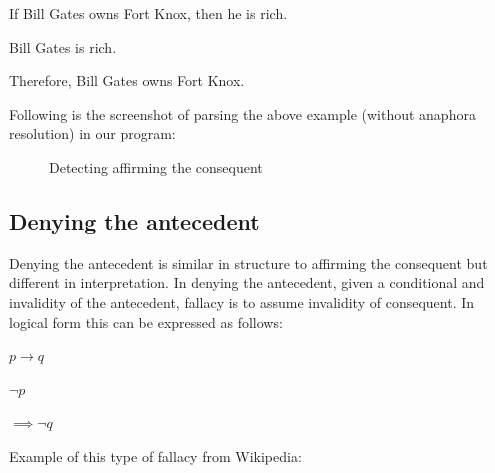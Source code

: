 \documentclass[14pt, english]{article}
\begin{document}
\begin{center}
If Bill Gates owns Fort Knox, then he is rich.
\par\end{center}

\begin{center}
Bill Gates is rich.
\par\end{center}

\begin{center}
Therefore, Bill Gates owns Fort Knox.
\par\end{center}

Following is the screenshot of parsing the above example (without anaphora
resolution) in our program:

\begin{figure}[htp]
 \caption{Detecting affirming the consequent} \end{figure}


\subsection{Denying the antecedent}

Denying the antecedent is similar in structure to affirming the consequent
but different in interpretation. In denying the antecedent, given a
conditional and invalidity of the antecedent, fallacy is to assume
invalidity of consequent. In logical form this can be expressed as
follows:

\begin{center}
$p\to q$
\par\end{center}

\begin{center}
$\neg p$
\par\end{center}

\begin{center}
$\implies\neg q$
\par\end{center}

Example of this type of fallacy from Wikipedia: 
\end{document}
